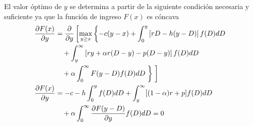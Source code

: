 El valor óptimo de $y$ se determina a partir de la siguiente condición necesaria y suficiente ya que la función de ingreso $F(x)$ es cóncava
\newpage
\begin{align}
	\label{prob:alpha_der_partial}
    \frac{\partial F(x)}{\partial y}  &= \frac{\partial}{\partial y} 
    \left[ \max_{y \geq x} \left\{ -c(y-x) + \int_{0}^{y} \left[ rD - h (y-D) \right] f(D) dD \right. \right. \nonumber \\
    & \quad + \int_{y}^{\infty} \left[ ry+ \alpha r (D-y) - p(D-y) \right] f(D) dD \nonumber \\
    & \quad + \alpha \int_{0}^{\infty} F(y-D) f(D) dD 
    \left. \vphantom{\int_{0}^{\infty}} \right\} 
    \left. \vphantom{\int_{0}^{\infty}} \right] \nonumber \\
    \frac{\partial F(x)}{\partial y}  &= -c -h \int_{0}^{y}f(D)dD + \int_{y}^{\infty}[(1- \alpha )r + p]f(D)dD \nonumber \\
    & \quad + \alpha \int_{0}^{\infty} \frac{\partial F(y-D)}{\partial y}f(D)dD = 0
\end{align}

